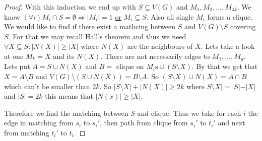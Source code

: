 \begin{proof}
	With this induction we end up with $S \subseteq V(G)$ and $M_{1}, M_{2}, \dots, M_{4k}$. We know $(\forall i) M_{i} \cap S = \emptyset \Rightarrow |M_{i}| =1$ \underline{or} $M_{i} \subseteq S$. Also all single $M_{i}$ forms a clique. We would like to find if there exist a mathcing between $S$ and $V(G) \setminus S$ covering $S$. For that we may recall Hall's theorem and thus we need $\forall X \subseteq S: |N(X)| \geq |X|$ where $N(X)$ are the neighbours of $X$. Lets take a look at one $M_{k} = X$ and its $N(X)$. There are not necessarily edges to $M_{1}, \dots, M_{g}$. Lets put $A = S \cup N(X)$ and $B = \text{ clique on } M_{i}\text{s} \cup (S \setminus X)$. By that we get that $X = A \setminus B$ and $V(G) \setminus (S \cup N(X)) = B \setminus A$. So $(S \setminus X) \cup N(X) = A \cap B$ which can't be smaller than $2k$. So $|S \setminus X| + |N(X)| \geq 2k$ where $S \setminus X| = |S| - |X|$ and $|S| = 2k$ this means that $|N(x)| \geq |X|$.
	
	Therefore we find the matching between $S$ and clique. Thus we take for each $i$ the edge in matching from $s_{i}$ to $s_{i}'$, then path from clique from $s_{i}'$ to $t_{i}'$ and next from matching $t_{i}'$ to $t_{i}$.
\end{proof}